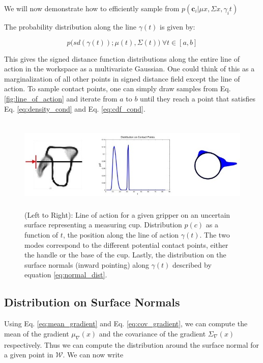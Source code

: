 \documentclass[letterpaper, 10 pt, conference]{ieeeconf}  %
\begin{document}
We will now demonstrate how to efficiently sample from $p(\textbf{c}_i|\mu{x},\Sigma{x},\gamma_i{t})$

The probability distribution along the line $\gamma(t)$ is given by:

\vspace{-2ex}
\begin{equation} \label{eq:line_of_act_dist}
p\big(sd(\gamma(t)) ; \mu(t),\Sigma(t)\big) \ \forall t \in [a,b] 
\end{equation}

This gives the signed distance function distributions along the entire line of action in the workspace as a multivariate Gaussian. One could think of this as a marginalization of all other points in signed distance field except the line of action. To sample contact points, one can simply draw samples from Eq. \ref{fig:line_of_action} and iterate from $a$ to $b$ until they reach a point that satisfies  Eq. \ref{eq:density_cond} and Eq. \ref{eq:cdf_cond}. 

\begin{figure}[ht!]
\centering
\includegraphics[width = 17cm, height = 4.5cm]{figures/Slide04.jpg}
\caption{ \footnotesize (Left to Right): Line of action for a given gripper on an uncertain surface representing a measuring cup. Distribution $p(c)$ as a function of $t$, the position along the line of action $\gamma(t)$. The two modes correspond to the different potential contact points, either the handle or the base of the cup. Lastly, the distribution on the surface normals (inward pointing) along $\gamma(t)$ described by equation \ref{eq:normal_dist}. }
\vspace*{-10pt}
\label{fig:GraspDist}
\end{figure}



\subsection{Distribution on Surface Normals}\label{sec:normals} 
Using Eq. \ref{eq:mean_gradient} and Eq. \ref{eq:cov_gradient}, we can compute the mean of the gradient $ \mu_{\nabla}(x)$ and the covariance of the gradient $\Sigma_{\nabla}(x)$ respectively. Thus we can compute the distribution around the surface normal for a given point in $\mathcal{W}$. We can now write 
\end{document}
